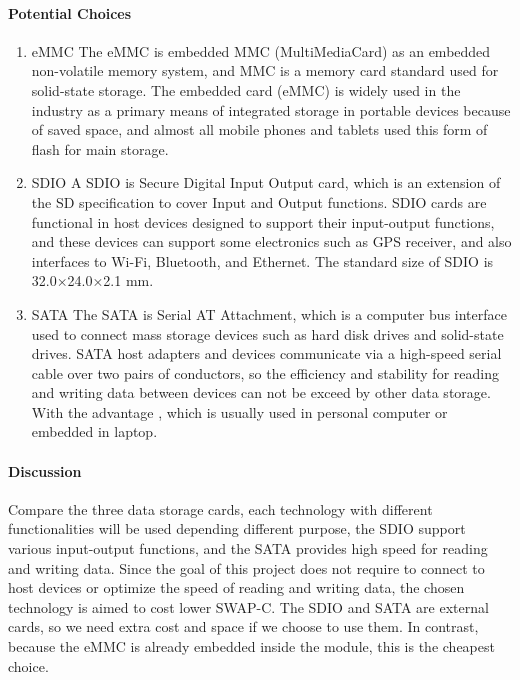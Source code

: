 \paragraph{Potential Choices}
\begin{enumerate}
\item{eMMC}
The eMMC is embedded MMC (MultiMediaCard) as an embedded non-volatile memory system, and MMC is a 
memory card standard used for solid-state storage. The embedded card (eMMC) is widely used in the 
industry as a primary means of integrated storage in portable devices because of saved space, and 
almost all mobile phones and tablets used this form of flash for main storage. \\

\item{SDIO}
A SDIO is Secure Digital Input Output card, which is an extension of the SD specification to cover 
Input and Output functions. SDIO cards are functional in host devices designed to support their 
input-output functions, and these devices can support some electronics such as GPS receiver, and 
also interfaces to Wi-Fi, Bluetooth, and Ethernet. The standard size of SDIO is 32.0×24.0×2.1 mm. \\

\item{SATA}
The SATA is Serial AT Attachment, which is a computer bus interface used to connect mass storage 
devices such as hard disk drives and solid-state drives. SATA host adapters and devices communicate 
via a high-speed serial cable over two pairs of conductors, so the efficiency and stability for 
reading and writing data between devices can not be exceed by other data storage. With the advantage
, which is usually used in personal computer or embedded in laptop. \\
\end{enumerate}

\paragraph{Discussion}
Compare the three data storage cards, each technology with different functionalities will be used 
depending different purpose, the SDIO support various input-output functions, and the SATA provides high 
speed for reading and writing data. Since the goal of this project does not require to connect to host 
devices or optimize the speed of reading and writing data, the chosen technology is aimed to cost lower 
SWAP-C. The SDIO and SATA are external cards, so we need extra cost and space if we choose to use them. 
In contrast, because the eMMC is already embedded inside the module, this is the cheapest choice.\\

